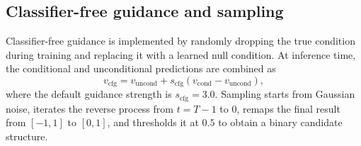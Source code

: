 \documentclass[10pt,a4paper]{article}
\begin{document}
\subsection{Classifier-free guidance and sampling}

Classifier-free guidance is implemented by randomly dropping the true condition during training and replacing it with a learned null condition. At inference time, the conditional and unconditional predictions are combined as
\begin{equation}
v_{\mathrm{cfg}}=v_{\mathrm{uncond}}+s_{\mathrm{cfg}}\left(v_{\mathrm{cond}}-v_{\mathrm{uncond}}\right),
\end{equation}
where the default guidance strength is $s_{\mathrm{cfg}}=3.0$. Sampling starts from Gaussian noise, iterates the reverse process from $t=T-1$ to $0$, remaps the final result from $[-1,1]$ to $[0,1]$, and thresholds it at $0.5$ to obtain a binary candidate structure.
\end{document}
